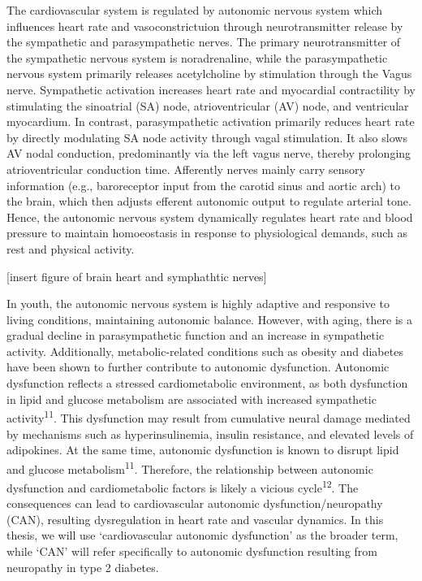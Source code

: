 \documentclass[
  a4paper,
  headsepline=true,
  open=any]{scrbook}
\begin{document}
The cardiovascular system is regulated by autonomic nervous system which
influences heart rate and vasoconstrictuion through neurotransmitter
release by the sympathetic and parasympathetic nerves. The primary
neurotransmitter of the sympathetic nervous system is noradrenaline,
while the parasympathetic nervous system primarily releases
acetylcholine by stimulation through the Vagus nerve. Sympathetic
activation increases heart rate and myocardial contractility by
stimulating the sinoatrial (SA) node, atrioventricular (AV) node, and
ventricular myocardium. In contrast, parasympathetic activation
primarily reduces heart rate by directly modulating SA node activity
through vagal stimulation. It also slows AV nodal conduction,
predominantly via the left vagus nerve, thereby prolonging
atrioventricular conduction time. Afferently nerves mainly carry sensory
information (e.g., baroreceptor input from the carotid sinus and aortic
arch) to the brain, which then adjusts efferent autonomic output to
regulate arterial tone. Hence, the autonomic nervous system dynamically
regulates heart rate and blood pressure to maintain homoeostasis in
response to physiological demands, such as rest and physical activity.

{[}insert figure of brain heart and symphathtic nerves{]}

In youth, the autonomic nervous system is highly adaptive and responsive
to living conditions, maintaining autonomic balance. However, with
aging, there is a gradual decline in parasympathetic function and an
increase in sympathetic activity. Additionally, metabolic-related
conditions such as obesity and diabetes have been shown to further
contribute to autonomic dysfunction. Autonomic dysfunction reflects a
stressed cardiometabolic environment, as both dysfunction in lipid and
glucose metabolism are associated with increased sympathetic
activity\textsuperscript{11}. This dysfunction may result from
cumulative neural damage mediated by mechanisms such as
hyperinsulinemia, insulin resistance, and elevated levels of adipokines.
At the same time, autonomic dysfunction is known to disrupt lipid and
glucose metabolism\textsuperscript{11}. Therefore, the relationship
between autonomic dysfunction and cardiometabolic factors is likely a
vicious cycle\textsuperscript{12}. The consequences can lead to
cardiovascular autonomic dysfunction/neuropathy (CAN), resulting
dysregulation in heart rate and vascular dynamics. In this thesis, we
will use `cardiovascular autonomic dysfunction' as the broader term,
while `CAN' will refer specifically to autonomic dysfunction resulting
from neuropathy in type 2 diabetes.
\end{document}
